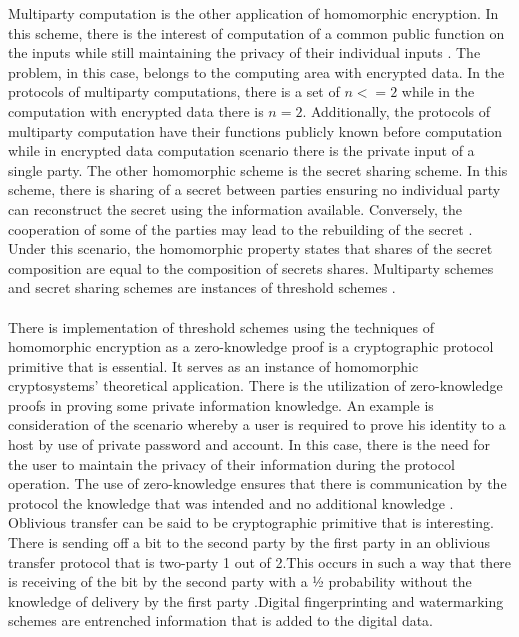 Multiparty computation is the other application of homomorphic encryption. In this scheme, there is the interest of computation of a common public function on the inputs while still maintaining the privacy of their individual inputs \cite{sen2013homomorphic}. The problem, in this case, belongs to the computing area with encrypted data. In the protocols of multiparty computations, there is a set of $n<=2$ while in the computation with encrypted data there is $n=2$\cite{sen2013homomorphic}. Additionally, the protocols of multiparty computation have their functions publicly known before computation while in encrypted data computation scenario there is the private input of a single party.
The other homomorphic scheme is the secret sharing scheme. In this scheme, there is sharing of a secret between parties ensuring no individual party can reconstruct the secret using the information available. Conversely, the cooperation of some of the parties may lead to the rebuilding of the secret \cite{sen2013homomorphic}. Under this scenario, the homomorphic property states that shares of the secret composition are equal to the composition of secrets shares. Multiparty schemes and secret sharing schemes are instances of threshold schemes \cite{sen2013homomorphic}. \\\\
There is implementation of threshold schemes using the techniques of homomorphic encryption as a zero-knowledge proof is a cryptographic protocol primitive that is essential. It serves as an instance of homomorphic cryptosystems’ theoretical application. There is the utilization of zero-knowledge proofs in proving some private information knowledge. An example is consideration of the scenario whereby a user is required to prove his identity to a host by use of private password and account. In this case, there is the need for the user to maintain the privacy of their information during the protocol operation. The use of zero-knowledge ensures that there is communication by the protocol the knowledge that was intended and no additional knowledge \cite{sen2013homomorphic}.
Oblivious transfer can be said to be cryptographic primitive that is interesting. There is sending off a bit to the second party by the first party in an oblivious transfer protocol that is two-party 1 out of 2.This occurs in such a way that there is receiving of the bit by the second party with a ½ probability without the knowledge of delivery by the first party \cite{sen2013homomorphic}.Digital fingerprinting and watermarking schemes are entrenched information that is added to the digital data. \\\\

